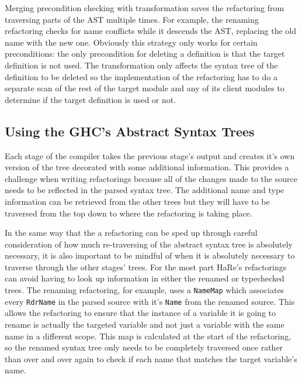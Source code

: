 Merging precondition checking with transformation saves the refactoring from traversing parts of the AST multiple times. For example, the renaming refactoring checks for name conflicts while it descends the AST, replacing the old name with the new one. Obviously this strategy only works for certain preconditions: the only precondition for deleting a definition is that the target definition is not used. The transformation only affects the syntax tree of the definition to be deleted so the implementation of the refactoring has to do a separate scan of the rest of the target module and any of its client modules to determine if the target definition is used or not.

\subsection{Using the GHC's Abstract Syntax Trees}
Each stage of the compiler takes the previous stage's output and creates it's own version of the tree decorated with some additional information. This provides a challenge when writing refactorings because all of the changes made to the source needs to be reflected in the parsed syntax tree. The additional name and type information can be retrieved from the other trees but they will have to be traversed from the top down to where the refactoring is taking place.

In the same way that the a refactoring can be sped up through careful consideration of how much re-traversing of the abstract syntax tree is absolutely necessary, it is also important to be mindful of when it is absolutely necessary to traverse through the other stages' trees. For the most part HaRe's refactorings can avoid having to look up information in either the renamed or typechecked trees. The renaming refactoring, for example, uses a \texttt{NameMap} which associates every \texttt{RdrName} in the parsed source with it's \texttt{Name} from the renamed source. This allows the refactoring to ensure that the instance of a variable it is going to rename is actually the targeted variable and not just a variable with the same name in a different scope. This map is calculated at the start of the refactoring, so the renamed syntax tree only needs to be completely traversed once rather than over and over again to check if each name that matches the target variable's name.

